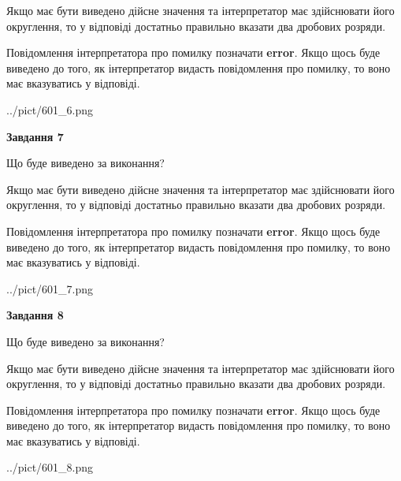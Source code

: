 \documentclass[12pt, ukrainian]{article}
\begin{document}
{\begin {Large}
Якщо має бути виведено дійсне значення та інтерпретатор має здійснювати його округлення, 
то у відповіді достатньо правильно вказати два дробових розряди.

Повідомлення інтерпретатора про помилку позначати \textbf{error}.
Якщо щось буде виведено до того, як інтерпретатор видасть повідомлення про помилку, 
то воно має вказуватись у відповіді. \par

\begin{center}
	{../pict/601_6.png}
\end{center}
\newpage

{\begin {center}\textbf{Завдання 7}\end {center}}\par
Що буде виведено за виконання? \par

Якщо має бути виведено дійсне значення та інтерпретатор має здійснювати його округлення, 
то у відповіді достатньо правильно вказати два дробових розряди.

Повідомлення інтерпретатора про помилку позначати \textbf{error}.
Якщо щось буде виведено до того, як інтерпретатор видасть повідомлення про помилку, 
то воно має вказуватись у відповіді. \par

\begin{center}
	{../pict/601_7.png}
\end{center}
\newpage

{\begin {center}\textbf{Завдання 8}\end {center}}\par
Що буде виведено за виконання? \par

Якщо має бути виведено дійсне значення та інтерпретатор має здійснювати його округлення, 
то у відповіді достатньо правильно вказати два дробових розряди.

Повідомлення інтерпретатора про помилку позначати \textbf{error}.
Якщо щось буде виведено до того, як інтерпретатор видасть повідомлення про помилку, 
то воно має вказуватись у відповіді. \par

\begin{center}
	{../pict/601_8.png}
\end{center}
\newpage


\end{Large}}
\end{document}
